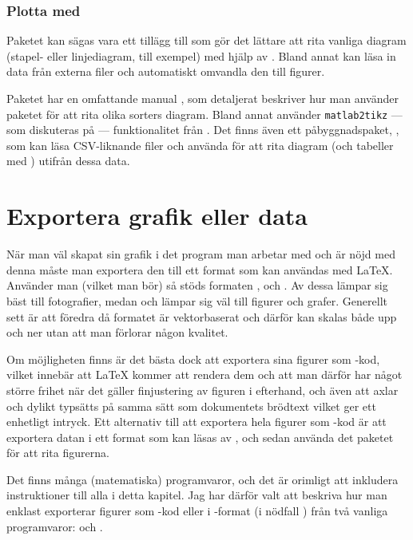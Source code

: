 \documentclass[10pt,../../a4.tex]{subfiles}
\begin{document}
\subsubsection{Plotta med }
Paketet  kan sägas vara ett tillägg till \PGFTikZ som gör
det lättare att rita vanliga diagram (stapel- eller linjediagram, till
exempel) med hjälp av \PGFTikZ. Bland annat kan  läsa in
data från externa filer och automatiskt omvandla den till figurer.

Paketet har en omfattande manual \parencite{Feuersanger13a}, som
detaljerat beskriver hur man använder paketet för att rita olika
sorters diagram.
Bland annat använder \texttt{matlab2tikz} — som diskuteras på
 — funktionalitet från .
Det finns även ett påbyggnadspaket, 
\parencite{Feuersanger13b}, som kan läsa
CSV-liknande filer och använda  för att rita diagram
(och tabeller med ) utifrån dessa data.

\section{Exportera grafik eller data}
När man väl skapat sin grafik i det program man arbetar med och är nöjd
med denna måste man exportera den till ett format som kan användas med
\LaTeX. Använder man \pdfLaTeX{} (vilket man bör) så stöds formaten \JPEG,
\PNG och \PDF. Av dessa lämpar sig \JPEG bäst till fotografier, medan
\PNG och \PDF lämpar sig väl till figurer och grafer.
Generellt sett är \PDF att föredra då formatet är vektorbaserat och
därför kan skalas både upp och ner utan att man förlorar någon kvalitet.

Om möjligheten finns är det bästa dock att exportera sina figurer som
\PGFTikZ-kod, vilket innebär att \LaTeX{} kommer att rendera dem och att
man därför har något större frihet när det gäller finjustering av figuren
i efterhand, och även att axlar och dylikt typsätts på samma sätt som
dokumentets brödtext vilket ger ett enhetligt intryck. Ett alternativ
till att exportera hela figurer som \PGFTikZ-kod är att exportera datan
i ett format som kan läsas av , och sedan använda det
paketet för att rita figurerna.

Det finns många (matematiska) programvaror, och det är orimligt att
inkludera instruktioner till alla i detta kapitel. Jag har därför valt
att beskriva hur man enklast exporterar figurer som \PGFTikZ-kod eller
i \PDF-format (i nödfall \PNG) från två vanliga programvaror:
\Rlogo och \MATLAB.
\end{document}
